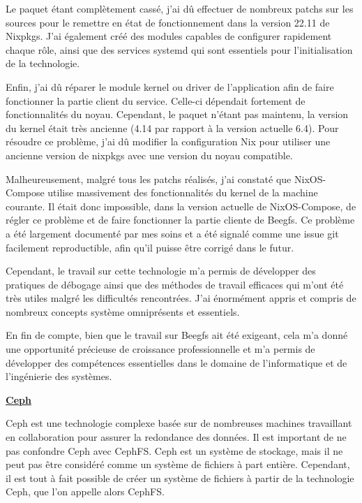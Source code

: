 \documentclass[a4paper,french,12pt, titlepage]{article}
\begin{document}
Le paquet étant complètement cassé, j'ai dû effectuer de nombreux patchs
sur les sources pour le remettre en état de fonctionnement dans la
version 22.11 de Nixpkgs. J'ai également créé des modules capables de
configurer rapidement chaque rôle, ainsi que des services systemd qui
sont essentiels pour l'initialisation de la technologie.\newline

Enfin, j'ai dû réparer le module kernel ou driver de l'application afin
de faire fonctionner la partie client du service. Celle-ci dépendait
fortement de fonctionnalités du noyau. Cependant, le paquet n'étant pas
maintenu, la version du kernel était très ancienne (4.14 par rapport à
la version actuelle 6.4). Pour résoudre ce problème, j'ai dû modifier la
configuration Nix pour utiliser une ancienne version de nixpkgs avec une
version du noyau compatible.\newline

Malheureusement, malgré tous les patchs réalisés, j'ai constaté que
NixOS-Compose utilise massivement des fonctionnalités du kernel de la
machine courante. Il était donc impossible, dans la version actuelle de
NixOS-Compose, de régler ce problème et de faire fonctionner la partie
cliente de Beegfs. Ce problème a été largement documenté par mes soins
et a été signalé comme une issue git facilement reproductible, afin
qu'il puisse être corrigé dans le futur.\newline

Cependant, le travail sur cette technologie m'a permis de développer des
pratiques de débogage ainsi que des méthodes de travail efficaces qui
m'ont été très utiles malgré les difficultés rencontrées. J'ai
énormément appris et compris de nombreux concepts système omniprésents
et essentiels.

En fin de compte, bien que le travail sur Beegfs ait été exigeant, cela
m'a donné une opportunité précieuse de croissance professionnelle et m'a
permis de développer des compétences essentielles dans le domaine de
l'informatique et de l'ingénierie des systèmes.\newline

\textbf{\href{https://docs.ceph.com/en/quincy/}{Ceph}}

Ceph est une technologie complexe basée sur de nombreuses machines
travaillant en collaboration pour assurer la redondance des données. Il
est important de ne pas confondre Ceph avec CephFS. Ceph est un système
de stockage, mais il ne peut pas être considéré comme un système de
fichiers à part entière. Cependant, il est tout à fait possible de créer
un système de fichiers à partir de la technologie Ceph, que l'on appelle
alors CephFS.\newline
\end{document}
